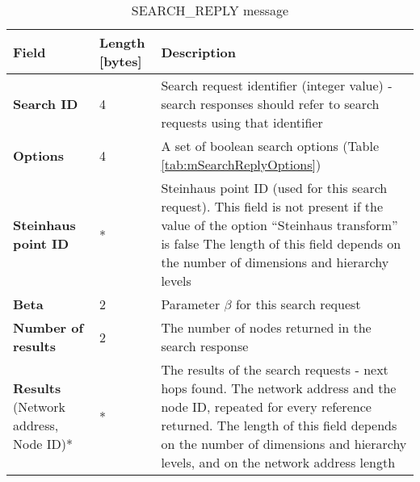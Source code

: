 \begin{table}[H]
\scriptsize
\begin{center}
\begin{tabular}{p{3.3cm} p{1.7cm} p{9.5cm}}
	\hline
	\textbf{Field}						& \textbf{Length} [bytes]				& \textbf{Description}				\\[1mm]
    \hline
    \textbf{Search ID}					& 4										& Search request identifier (integer value) - search responses should refer to search requests using that identifier					\\[1.5mm]
	\textbf{Options}					& 4										& A set of boolean search options (Table \ref{tab:mSearchReplyOptions})				\\[1.5mm]
	\textbf{Steinhaus point ID} \newline [optional]		& *						& Steinhaus point ID (used for this search request). This field is not present if the value of the option ``Steinhaus transform'' is false \newline * The length of this field depends on the number of dimensions and hierarchy levels					\\[1.5mm]	
	\textbf{Beta}						& 2										& Parameter $\beta$ for this search request					\\[1.5mm]
	\textbf{Number of results}			& 2										& The number of nodes returned in the search response		\\[1.5mm]
	\textbf{Results} \newline (Network address, Node ID)*			& *			& The results of the search requests - next hops found. The network address and the node ID, repeated for every reference returned. \newline * The length of this field depends on the number of dimensions and hierarchy levels, and on the network address length		\\[1.5mm]
    \hline
\end{tabular}
\end{center}
\caption{SEARCH\_REPLY message}
\label{tab:mSearchReply}
\end{table}

